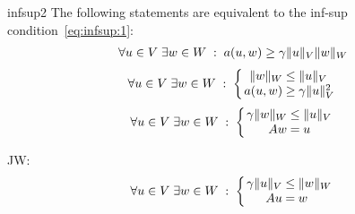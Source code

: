 \begin{Lemma}{infsup2}
  The following statements are equivalent to the inf-sup
  condition~\eqref{eq:infsup:1}:
  \begin{gather}
    \label{eq:infsup:2}
    \forall u\in V \;\exists w\in W \;:\; a(u,w) \ge \gamma \lVert u\rVert_V\lVert w\rVert_W
  \end{gather}
  \begin{gather}
    \label{eq:infsup:3}
    \forall u\in V
    \;\exists w\in W \;:\;
    \left\{
    \arraycolsep0.3ex
    \begin{array}{rcl}
      \norm{w}_W &\le&\norm{u}_V\\
      a(u,w) &\ge& \ellipa \norm{u}_V^2
    \end{array}
    \right.
  \end{gather}
  \begin{gather}
    \label{eq:infsup:3a}
    \forall u\in V
    \;\exists w\in W \;:\;
    \left\{
    \arraycolsep0.3ex
    \begin{array}{rcl}
      \ellipa \norm{w}_W &\le&\norm{u}_V\\
      Aw &=& u
    \end{array}
    \right.
  \end{gather}
\end{Lemma}
  \begin{todo}
    JW:
  \begin{gather}
    \forall u\in V
    \;\exists w\in W \;:\;
    \left\{
    \arraycolsep0.3ex
    \begin{array}{rcl}
      \ellipa \norm{u}_V &\le&\norm{w}_W\\
      Au &=& w
    \end{array}
    \right.
  \end{gather}
  \end{todo}

